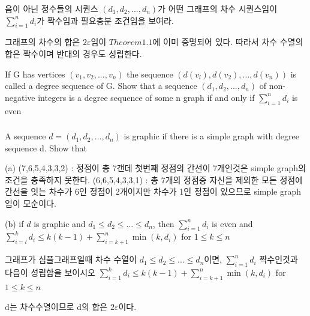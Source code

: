 음이 아닌 정수들의 시퀀스 $(d_1, d_2, ... , d_n)$가 어떤 그래프의 차수 시퀀스임이 $\sum_{i=1}^n d_i$가 짝수임과 필요충분 조건임을 보여라.

그래프의 차수의 합은 $2\varepsilon$임이  $Theorem1.1$에 이미 증명되어 있다. 따라서 차수 수열의 합은 짝수이며 반대의 경우도 성립한다.


If G has vertices $(v_1, v_2, ... , v_n)$ the sequence $(d(v_l), d(v_2), ... , d(v_n))$ is called a degree sequence of G. 
Show that a sequence $(d_1, d_2, ... , d_n)$ of non-negative integers is a degree sequence of some n
graph if and only if $\sum_{i=1}^n d_i$ is even

\subsubsection{} 
    A sequence $d = (d_1, d_2 , ... , d_n)$ is graphic if there is a simple graph with degree sequence d. Show that

(a) (7,6,5,4,3,3,2) : 정점이 총 7갠데 첫번째 정점의 간선이 7개인것은 simple graph의 조건을 충족하지 못한다.
(6,6,5,4,3,3,1) : 총 7개의 정점중 자신을 제외한 모든 정점에 간선을 잇는 차수가 6인 정점이 2개이지만 차수가 1인 정점이 있으므로  simple graph임이 모순이다.

(b) if $d$ is graphic and $d_1 \le d_2 \le ... \le d_n$, then $\sum_{i=1}^{n} d_i$ is even and $\sum_{i=l}^{k} d_i \le k(k -1)+\sum_{i=k+1}^{n}\min(k, d_i)$ for $1 \le k \le n$

그래프가 심플그래프일때 차수 수열이 $d_1 \le d_2 \le ... \le d_n$이면,  $\sum_{i=1}^{n} d_i$ 짝수인것과 다음이 성립함을 보이시오
$\sum_{i=1}^{k} d_i \le k(k -1)+\sum_{i=k+1}^{n}\min(k, d_i)$ for $1 \le k \le n$

d는 차수수열이므로 d의 합은 $2\varepsilon$이다.
\subsubsection{} 
%
\subsubsection{} 
%
\subsubsection{} 
%
\subsubsection{} 

